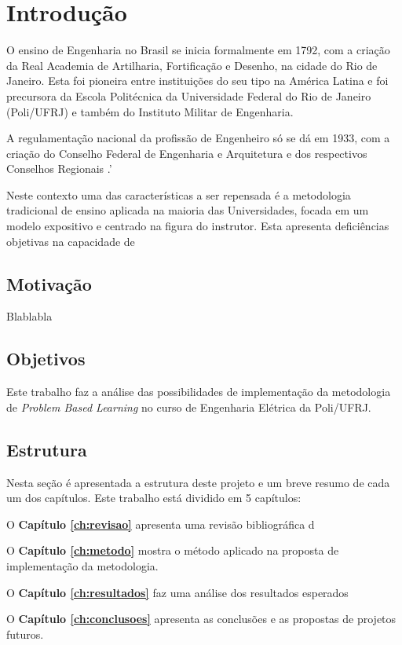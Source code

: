 \chapter{Introdução} \label{ch:intro}

	O ensino de Engenharia no Brasil se inicia formalmente em 1792, com a criação da Real Academia de Artilharia, Fortificação e Desenho, na cidade do Rio de Janeiro. Esta foi pioneira entre instituições do seu tipo na América Latina e foi precursora da Escola Politécnica da Universidade Federal do Rio de Janeiro (Poli/UFRJ) e também do Instituto Militar de Engenharia.
	
	A regulamentação nacional da profissão de Engenheiro só se dá em 1933, com a criação do Conselho Federal de Engenharia e Arquitetura e dos respectivos Conselhos Regionais \cite{historia-confea}.'
	
	Neste contexto uma das características a ser repensada é a metodologia tradicional de ensino aplicada na maioria das Universidades, focada em um modelo expositivo e centrado na figura do instrutor. Esta apresenta deficiências objetivas na capacidade de 

	\section{Motivação}

		Blablabla
		
	\section{Objetivos}
	
		Este trabalho faz a análise das possibilidades de implementação da metodologia de \textit{Problem Based Learning} no curso de Engenharia Elétrica da Poli/UFRJ.
		
	\section{Estrutura}
	
		Nesta seção é apresentada a estrutura deste projeto e um breve resumo de cada um dos capítulos. Este trabalho está dividido em 5 capítulos:
		
		O \textbf{Capítulo \ref{ch:revisao}} apresenta uma revisão bibliográfica d
		
		O \textbf{Capítulo \ref{ch:metodo}} mostra o método aplicado na proposta de implementação da metodologia.
		
		O \textbf{Capítulo \ref{ch:resultados}} faz uma análise dos resultados esperados 
		
		O \textbf{Capítulo \ref{ch:conclusoes}} apresenta as conclusões e as propostas de projetos futuros.